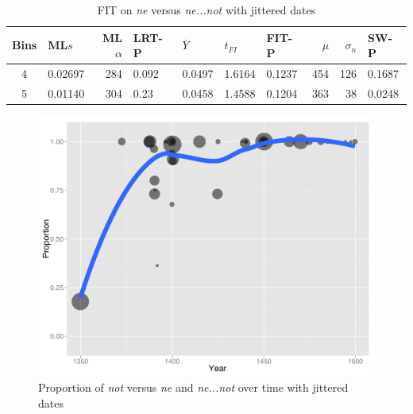 %
%

\begin{table}[ht]
\centering
\begin{tabular}{c  l  r  l  l  l  l   r  r  l  }
  \hline
Bins & ML$s$ & ML$\alpha$ & LRT-P & $\overline{Y}$ & $t_{FI}$ & FIT-P & $\mu$ & $\sigma_n$ & SW-P \\ 
  \hline
  4 & 0.02697 & 284 & 0.092 & 0.0497 & 1.6164 & 0.1237 & 454 & 126 & 0.1687 \\ 
  5 & 0.01140 & 304 & 0.23 & 0.0458 & 1.4588 & 0.1204 & 363 & 38 & 0.0248 \\    \hline
\end{tabular}
\caption{FIT on \textit{\color{red}  ne} versus \textit{\color{blue} ne...not} with jittered dates}
\label{jitter-split-table1}
\end{table}


\begin{figure}
\centering
     \includegraphics[width=\textwidth]{jitter-split-plot2.pdf}
\caption{Proportion of \textit{\color{green} not} versus \textit{\color{red}  ne} and \textit{\color{blue} ne...not} over time with jittered dates}
\label{jitter-split-plot2}
\end{figure}

%
%
%

